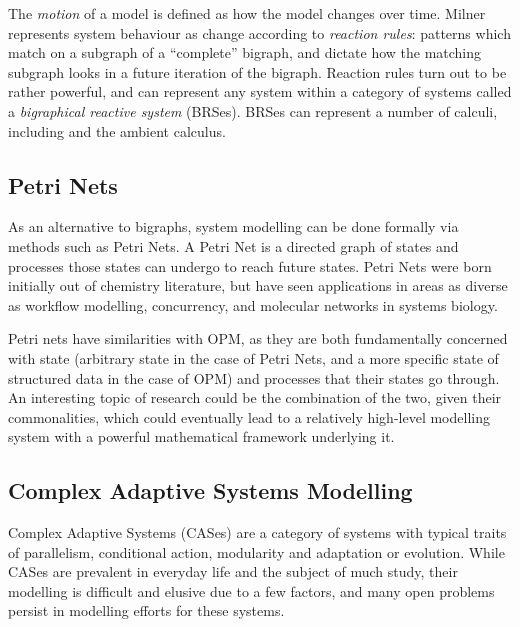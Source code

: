 \documentclass[draft]{article}
\begin{document}
The \emph{motion} of a model is defined as how the model changes over time.
Milner represents system behaviour as change according to \emph{reaction rules}:
patterns which match on a subgraph of a ``complete'' bigraph, and dictate how
the matching subgraph looks in a future iteration of the bigraph. Reaction rules
turn out to be rather powerful, and can represent any system within a category
of systems called a \emph{bigraphical reactive
  system}\cite{milner_early_brs_definition} (BRSes). BRSes can represent a
number of calculi, including \picalculus{} and the ambient
calculus\cite{bigraphs_and_transitions_milner_jensen}.\par



\subsection{Petri Nets}
\label{subsubsec:petrinets}
As an alternative to bigraphs, system modelling can be done formally via methods
such as Petri Nets\cite{petri_net_seminal}. A Petri Net is a directed graph of
states and processes those states can undergo to reach future states. Petri Nets
were born initially out of chemistry literature\cite{petri_net_seminal}, but
have seen applications in areas as diverse as workflow
modelling\cite{petri_net_workflow_modelling},
concurrency\cite{petri_net_concurrency}, and molecular networks in systems
biology\cite{petri_nets_for_biology}.\par

Petri nets have similarities with OPM, as they are both fundamentally concerned
with state (arbitrary state in the case of Petri Nets, and a more specific state
of structured data in the case of OPM) and processes that their states go
through. An interesting topic of research could be the combination of the two,
given their commonalities, which could eventually lead to a relatively
high-level modelling system with a powerful mathematical framework underlying
it.\par


\subsection{Complex Adaptive Systems Modelling}
Complex Adaptive Systems (CASes) are a category of systems with typical traits
of parallelism, conditional action, modularity and adaptation or evolution\cite{holland_studying_adaptive_systems}.
While CASes are prevalent in everyday life and the subject of much study, their
modelling is difficult and elusive due to a few factors, and many open problems
persist in modelling efforts for these systems\cite{gell-mann}.\par
\end{document}
